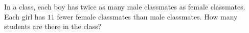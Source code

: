 In a class, each boy has twice as many male classmates as female classmates. Each girl has $11$ fewer female classmates than male classmates. How many students are there in the class?
